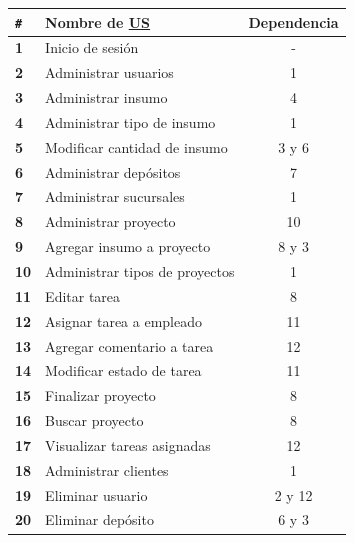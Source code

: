 \documentclass[a4paper, 12pt,twoside]{report}  %
\numberwithin{equation}{subsection} %
\begin{document}
\begin{table}[h!]
	\centering
	\begin{tabular}{ |p{0.5cm}|p{9cm}|c|  }
		\hline
		\verb|#|& \textbf{Nombre de \hyperlink{US}{US}}& \textbf{Dependencia} \\
		\hline
		\textbf{1} & \cellcolor{marca_US_realizada_anterior}Inicio de sesión & - \\
		\hline
		\textbf{2} & \cellcolor{marca_US_realizada_anterior}Administrar usuarios & 1 \\
		\hline
		\textbf{3} & \cellcolor{marca_US_realizada_anterior}Administrar insumo & 4 \\
		\hline
		\textbf{4} & \cellcolor{marca_US_realizada_anterior}Administrar tipo de insumo & 1 \\
		\hline
		\textbf{5} & \cellcolor{marca_US_realizada_anterior}Modificar cantidad de insumo & 3 y 6 \\
		\hline
		\textbf{6} & \cellcolor{marca_US_realizada_anterior}Administrar depósitos & 7 \\
		\hline
		\textbf{7} & \cellcolor{marca_US_realizada_anterior}Administrar sucursales & 1 \\
		\hline
		\textbf{8} & \cellcolor{marca_US_realizada}Administrar proyecto & 10 \\
		\hline
		\textbf{9} & Agregar insumo a proyecto & 8 y 3 \\
		\hline
		\textbf{10} & \cellcolor{marca_US_realizada}Administrar tipos de proyectos & 1 \\
		\hline
		\textbf{11} & Editar tarea & 8 \\
		\hline
		\textbf{12} & \cellcolor{marca_US_realizada}Asignar tarea a empleado & 11\\
		\hline
		\textbf{13} & Agregar comentario a tarea & 12 \\
		\hline
		\textbf{14} & Modificar estado de tarea & 11 \\
		\hline
		\textbf{15} & Finalizar proyecto & 8 \\
		\hline
		\textbf{16} & \cellcolor{marca_US_realizada}Buscar proyecto & 8 \\
		\hline
		\textbf{17} & \cellcolor{marca_US_realizada}Visualizar tareas asignadas & 12 \\
		\hline
		\textbf{18} & \cellcolor{marca_US_realizada_anterior}Administrar clientes & 1 \\
		\hline
		\textbf{19} & Eliminar usuario & 2 y 12 \\
		\hline
		\textbf{20} & Eliminar depósito & 6 y 3 \\

\end{tabular}
\end{table}
\end{document}
